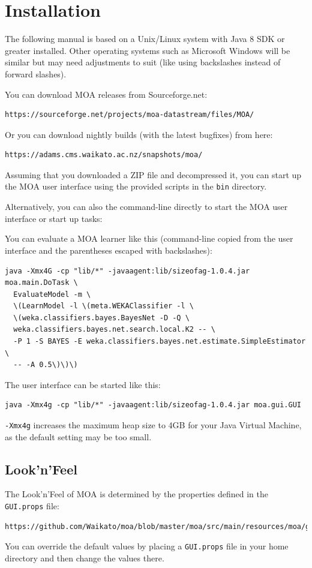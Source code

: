 \documentclass[a4paper,12pt,twoside]{book}
\begin{document}
\chapter{Installation}

The following manual is based on a Unix/Linux system with Java 8 SDK or greater installed.
Other operating systems such as Microsoft Windows will be similar but may need adjustments
to suit (like using backslashes instead of forward slashes).

\noindent You can download MOA releases from Sourceforge.net:
\begin{verbatim}
https://sourceforge.net/projects/moa-datastream/files/MOA/
\end{verbatim}

\noindent Or you can download nightly builds (with the latest bugfixes) from here:
\begin{verbatim}
https://adams.cms.waikato.ac.nz/snapshots/moa/
\end{verbatim}

Assuming that you downloaded a ZIP file and decompressed it, you can start up
the MOA user interface using the provided scripts in the \verb|bin| directory.

Alternatively, you can also the command-line directly to start the MOA user
interface or start up tasks:

You can evaluate a MOA learner like this (command-line copied from the user
interface and the parentheses escaped with backslashes):
{\scriptsize
\begin{verbatim}
java -Xmx4G -cp "lib/*" -javaagent:lib/sizeofag-1.0.4.jar moa.main.DoTask \
  EvaluateModel -m \
  \(LearnModel -l \(meta.WEKAClassifier -l \
  \(weka.classifiers.bayes.BayesNet -D -Q \
  weka.classifiers.bayes.net.search.local.K2 -- \
  -P 1 -S BAYES -E weka.classifiers.bayes.net.estimate.SimpleEstimator \
  -- -A 0.5\)\)\)
\end{verbatim}}
\noindent The user interface can be started like this:
{\scriptsize
\begin{verbatim}
java -Xmx4g -cp "lib/*" -javaagent:lib/sizeofag-1.0.4.jar moa.gui.GUI
\end{verbatim}}

\texttt{-Xmx4g} increases the maximum heap size to 4GB for your Java Virtual Machine, as
the default setting may be too small.

\section{Look'n'Feel}
The Look'n'Feel of MOA is determined by the properties defined in the \verb|GUI.props|
file:
{\scriptsize
\begin{verbatim}
https://github.com/Waikato/moa/blob/master/moa/src/main/resources/moa/gui/GUI.props
\end{verbatim}}
You can override the default values by placing a \verb|GUI.props| file in your
home directory and then change the values there.
\end{document}
